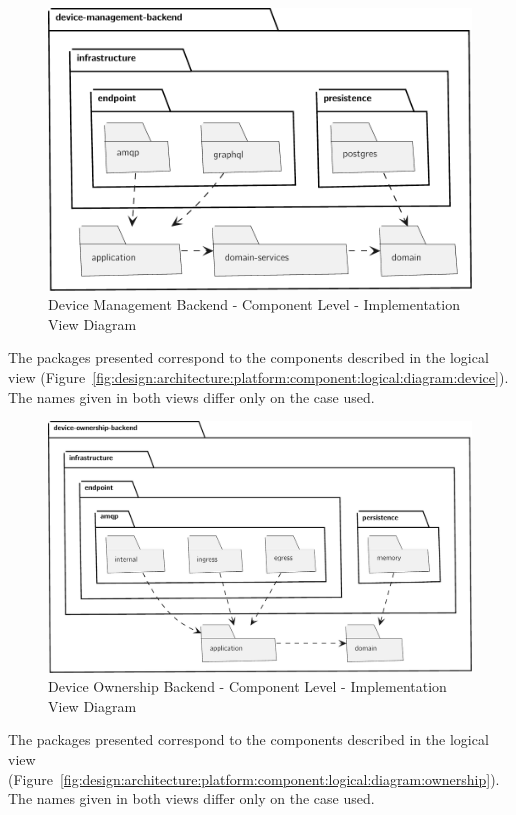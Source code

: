\begin{figure}[H]
   \centering
   \includegraphics[page=1,width=0.8\columnwidth]{assets/diagrams/design/architectural/level3/development/device-management-backend.pdf}
   \caption[Device Management Backend - Component Level - Implementation View Diagram]{Device Management Backend - Component Level - Implementation View Diagram}
   \label{fig:design:architecture:platform:component:development:diagram:device}
\end{figure}

The packages presented correspond to the components described in the logical view (Figure~\ref{fig:design:architecture:platform:component:logical:diagram:device}). The names given in both views differ only on the case used.

\begin{figure}[H]
   \centering
   \includegraphics[page=1,width=0.8\columnwidth]{assets/diagrams/design/architectural/level3/development/device-ownership-backend.pdf}
   \caption[Device Ownership Backend - Component Level - Implementation View Diagram]{Device Ownership Backend - Component Level - Implementation View Diagram}
   \label{fig:design:architecture:platform:component:development:diagram:ownership}
\end{figure}

The packages presented correspond to the components described in the logical view (Figure~\ref{fig:design:architecture:platform:component:logical:diagram:ownership}). The names given in both views differ only on the case used.
